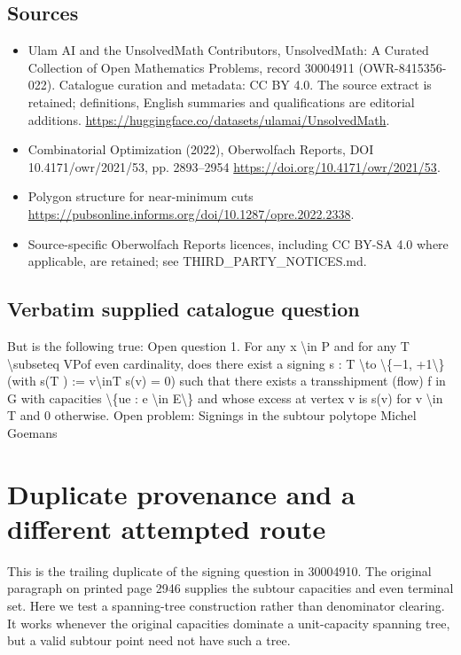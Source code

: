 \documentclass[11pt]{article}
\begin{document}
\subsection{Sources}
\begin{itemize}
\item[S1] Ulam AI and the UnsolvedMath Contributors, UnsolvedMath: A Curated Collection of Open Mathematics Problems, record 30004911 (OWR-8415356-022). Catalogue curation and metadata: CC BY 4.0. The source extract is retained; definitions, English summaries and qualifications are editorial additions.
\url{https://huggingface.co/datasets/ulamai/UnsolvedMath}.
\item[S2] Combinatorial Optimization (2022), Oberwolfach Reports, DOI 10.4171/owr/2021/53, pp. 2893--2954
\url{https://doi.org/10.4171/owr/2021/53}.
\item[S3] Polygon structure for near-minimum cuts
\url{https://pubsonline.informs.org/doi/10.1287/opre.2022.2338}.
\item Source-specific Oberwolfach Reports licences, including CC BY-SA 4.0 where applicable, are retained; see THIRD\_PARTY\_NOTICES.md.
\end{itemize}
\subsection{Verbatim supplied catalogue question}
But is the following true: Open question 1. For any x \textbackslash{}in P and for any T \textbackslash{}subseteq VPof even cardinality, does there exist a signing s : T \textbackslash{}to \textbackslash{}\{−1, +1\textbackslash{}\} (with s(T ) := v\textbackslash{}inT s(v) = 0) such that there exists a transshipment (flow) f in G with capacities \textbackslash{}\{ue : e \textbackslash{}in E\textbackslash{}\} and whose excess at vertex v is s(v) for v \textbackslash{}in T and 0 otherwise. Open problem: Signings in the subtour polytope Michel Goemans

\section{Duplicate provenance and a different attempted route}
This is the trailing duplicate of the signing question in 30004910.
The original paragraph on printed page 2946 supplies the subtour
capacities and even terminal set. Here we test a spanning-tree
construction rather than denominator clearing. It works whenever
the original capacities dominate a unit-capacity spanning tree,
but a valid subtour point need not have such a tree.
\end{document}
